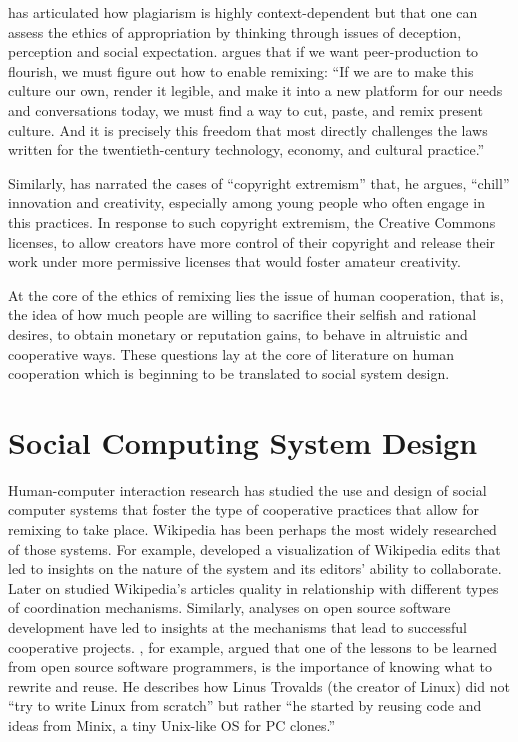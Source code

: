 \citet{posner_little_2007} has articulated how plagiarism is highly context-dependent but that one can assess the ethics of appropriation by thinking through issues of deception, perception and social expectation.
\citet{benkler_wealth_2006} argues that if we want peer-production to flourish, we must figure out how to enable remixing:
``If we are to make this culture our own, render it legible, and make it into a new platform for our needs and conversations today, we must find a way to cut, paste, and remix present culture. And it is precisely this freedom that most directly challenges the laws written for the twentieth-century technology, economy, and cultural practice.''

Similarly, \citet{lessig_remix:_2008} has narrated the cases of ``copyright extremism'' that, he argues, ``chill''
 innovation and creativity, especially among young people who often engage in this practices.
In response to such copyright extremism, the Creative Commons licenses, to allow creators have more control of their copyright and release their work under more permissive licenses that would foster amateur creativity.

At the core of the ethics of remixing lies the issue of human cooperation, that is, the idea of how much people are willing to sacrifice their selfish and rational desires, to obtain monetary or reputation gains, to behave in altruistic and cooperative ways. 
These questions lay at the core of literature on human cooperation which is beginning to be translated to social system design.

\section{Social Computing System Design}

Human-computer interaction research has studied the use and design of social computer systems that foster the type of cooperative practices that allow for remixing to take place.
Wikipedia has been perhaps the most widely researched of those systems. 
For example, \citet{viegas_studying_2004} developed a visualization of Wikipedia edits that led to insights on the nature of the system and its editors' ability to collaborate. 
Later on \citet{kittur_harnessing_2008} studied Wikipedia's articles quality in relationship with different types of coordination mechanisms.
Similarly, analyses on open source software development have led to insights at the mechanisms that lead to successful cooperative projects. 
\citet{raymond_cathedral_1999}, for example, argued that one of the lessons to be learned from open source software programmers, is the importance of knowing what to rewrite and reuse. 
He describes how Linus Trovalds (the creator of Linux) did not ``try to write Linux from scratch'' but rather ``he started by reusing code and ideas from Minix, a tiny Unix-like OS for PC clones.'' 

